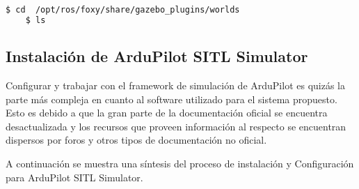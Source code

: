 \begin{lstlisting}[language = bash]
    $ cd  /opt/ros/foxy/share/gazebo_plugins/worlds
    $ ls 
\end{lstlisting}

\subsection{Instalación de ArduPilot SITL Simulator}
Configurar y trabajar con el framework de simulación de ArduPilot es quizás la parte más compleja en cuanto al software utilizado para el sistema propuesto. Esto es debido a que la gran parte de la documentación oficial se encuentra desactualizada y los recursos que proveen información al respecto se encuentran dispersos por foros y otros tipos de documentación no oficial. 

A continuación se muestra una síntesis del proceso de instalación y Configuración para ArduPilot SITL Simulator.

